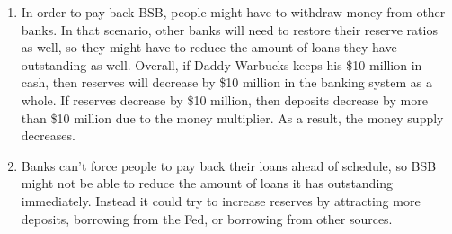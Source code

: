\documentclass{article}
\begin{document}
\begin{enumerate}
\begin{enumerate}
	\item In order to pay back BSB, people might have to withdraw money from other banks. In that scenario, other banks will need to restore their reserve ratios as well, so they might have to reduce the amount of loans they have outstanding as well. Overall, if Daddy Warbucks keeps his \$10 million in cash, then reserves will decrease by \$10 million in the banking system as a whole. If reserves decrease by \$10 million, then deposits decrease by more than \$10 million due to the money multiplier. As a result, the money supply decreases. 
	
	\item Banks can't force people to pay back their loans ahead of schedule, so BSB might not be able to reduce the amount of loans it has outstanding immediately. Instead it could try to increase reserves by attracting more deposits, borrowing from the Fed, or borrowing from other sources.
	
	\end{enumerate}

\end{enumerate}
\end{document}
